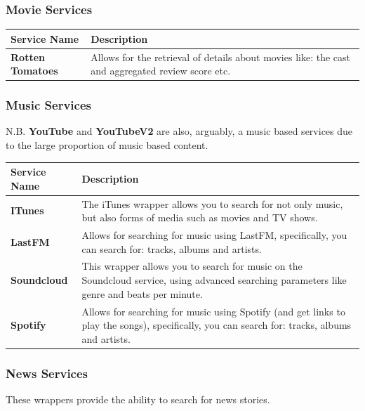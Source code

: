 \documentclass[letterpaper,10pt,english]{sphinxmanual}
\begin{document}
\subsubsection{Movie Services}
\label{overview:movie-services}
\begin{tabulary}{\linewidth}{|L|L|}
\hline
\textbf{
Service Name
} & \textbf{
Description
}\\\hline

\textbf{Rotten Tomatoes}
 & 
Allows for the retrieval of details about movies like: the cast and aggregated review score etc.
\\\hline
\end{tabulary}



\subsubsection{Music Services}
\label{overview:music-services}
N.B. \textbf{YouTube} and \textbf{YouTubeV2} are also, arguably, a music based services due to the large proportion of music based content.

\begin{tabulary}{\linewidth}{|L|L|}
\hline
\textbf{
Service Name
} & \textbf{
Description
}\\\hline

\textbf{ITunes}
 & 
The iTunes wrapper allows you to search for not only music, but also forms of media such as movies and TV shows.
\\\hline

\textbf{LastFM}
 & 
Allows for searching for music using LastFM, specifically, you can search for: tracks, albums and artists.
\\\hline

\textbf{Soundcloud}
 & 
This wrapper allows you to search for music on the Soundcloud service, using advanced searching parameters like genre and beats per minute.
\\\hline

\textbf{Spotify}
 & 
Allows for searching for music using Spotify (and get links to play the songs), specifically, you can search for: tracks, albums and artists.
\\\hline
\end{tabulary}



\subsubsection{News Services}
\label{overview:news-services}
These wrappers provide the ability to search for news stories.
\end{document}
